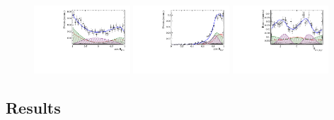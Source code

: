 \begin{figure}[h]
		\includegraphics[width=0.32\textwidth, height = !]{figs/lassoFit/LASSO/h_cosTheta_Kpi_mod.pdf} 
		\includegraphics[width=0.32\textwidth, height = !]{figs/lassoFit/LASSO/h_cosTheta_Dspi_mod.pdf} 
		\includegraphics[width=0.32\textwidth, height = !]{figs/lassoFit/LASSO/h_phi_Kpi_Dspi_mod.pdf} 

		\caption{} 		
\end{figure}	

\clearpage
\subsection{Results}

